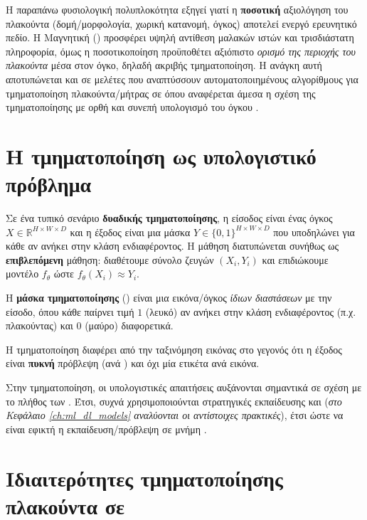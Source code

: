 Η παραπάνω φυσιολογική πολυπλοκότητα εξηγεί γιατί η \textbf{ποσοτική} αξιολόγηση του πλακούντα (δομή/μορφολογία, χωρική
κατανομή, όγκος) αποτελεί ενεργό ερευνητικό πεδίο. Η Μαγνητική () προσφέρει υψηλή αντίθεση μαλακών ιστών και τρισδιάστατη
πληροφορία, όμως η ποσοτικοποίηση προϋποθέτει αξιόπιστο \textit{ορισμό της περιοχής του πλακούντα} μέσα στον όγκο, δηλαδή
ακριβής τμηματοποίηση. Η ανάγκη αυτή αποτυπώνεται και σε μελέτες που αναπτύσσουν αυτοματοποιημένους αλγορίθμους για
τμηματοποίηση πλακούντα/μήτρας σε  όπου αναφέρεται άμεσα η σχέση της τμηματοποίησης με ορθή και συνεπή υπολογισμό του όγκου \cite{shahedi2021placenta}.

\section{Η τμηματοποίηση ως υπολογιστικό πρόβλημα}
\label{sec:seg_problem}

Σε ένα τυπικό σενάριο \textbf{δυαδικής τμηματοποίησης}, η είσοδος είναι ένας όγκος
$X \in \mathbb{R}^{H \times W \times D}$ και η έξοδος είναι μια μάσκα
$Y \in \{0,1\}^{H \times W \times D}$ που υποδηλώνει για κάθε  αν ανήκει στην κλάση ενδιαφέροντος.
Η μάθηση διατυπώνεται συνήθως ως \textbf{επιβλεπόμενη} μάθηση: διαθέτουμε σύνολο ζευγών $(X_i, Y_i)$ και επιδιώκουμε
μοντέλο $f_\theta$ ώστε $f_\theta(X_i)\approx Y_i$.

Η \textbf{μάσκα τμηματοποίησης} () είναι μια εικόνα/όγκος \textit{ίδιων διαστάσεων} με την είσοδο, 
όπου κάθε  παίρνει τιμή $1$ (λευκό) αν ανήκει στην κλάση ενδιαφέροντος (π.χ. πλακούντας) και $0$ (μαύρο) διαφορετικά.

Η τμηματοποίηση διαφέρει από την ταξινόμηση εικόνας  στο γεγονός ότι η έξοδος είναι \textbf{πυκνή} πρόβλεψη (ανά ) και όχι μία ετικέτα ανά εικόνα.

Στην  τμηματοποίηση, οι υπολογιστικές απαιτήσεις αυξάνονται σημαντικά σε σχέση με το πλήθος των . Έτσι, συχνά
χρησιμοποιούνται στρατηγικές \textbf{} εκπαίδευσης και \textbf{}
(\textit{στο Κεφάλαιο \ref{ch:ml_dl_models} αναλύονται οι αντίστοιχες πρακτικές}), έτσι ώστε να είναι
εφικτή η εκ\-παίδευση/πρόβλεψη σε μνήμη .


\section{Ιδιαιτερότητες τμηματοποίησης πλακούντα σε }
\label{sec:placenta_specifics}

